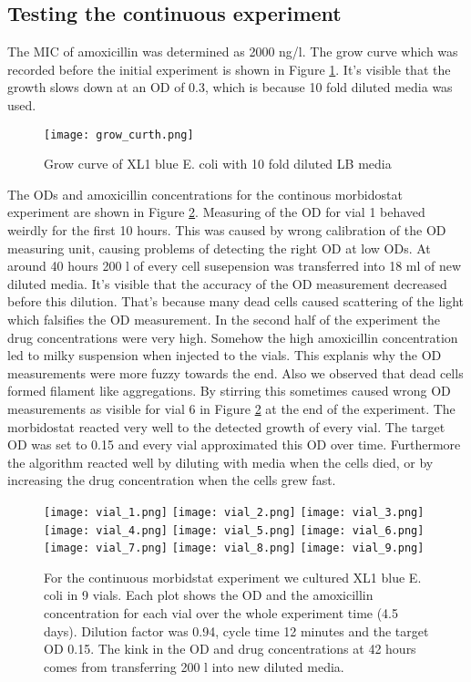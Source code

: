 \subsection{Testing the continuous experiment}
The MIC of amoxicillin was determined as 2000 ng/\textmu l. The grow curve which was recorded before the initial experiment is shown in Figure \ref{figure:grow_curve}. It's visible that the growth slows down at an OD of 0.3, which is because 10 fold diluted media was used. 
\begin{figure}
	\texttt{[image: grow\_curth.png]}\hfill
	\caption{Grow curve of XL1 blue E. coli with 10 fold diluted LB media}
	\label{figure:grow_curve}
\end{figure}
The ODs and amoxicillin concentrations for the continous morbidostat experiment are shown in Figure \ref{figure:continuos_test}. Measuring of the OD for vial 1 behaved weirdly for the first 10 hours. This was caused by wrong calibration of the OD measuring unit, causing problems of detecting the right OD at low ODs. At around 40 hours 200 \textmu l of every cell susepension was transferred into 18 ml of new diluted media. It's visible that the accuracy of the OD measurement decreased before this dilution. That's because many dead cells caused scattering of the light which falsifies the OD measurement. In the second half of the experiment the drug concentrations were very high. Somehow the high amoxicillin concentration led to milky suspension when injected to the vials. This explanis why the OD measurements were more fuzzy towards the end. Also we observed that dead cells formed filament like aggregations. By stirring this sometimes caused wrong OD measurements as visible for vial 6 in Figure \ref{figure:continuos_test} at the end of the experiment. The morbidostat reacted very well to the detected growth of every vial. The target OD was set to 0.15 and every vial approximated this OD over time. Furthermore the algorithm reacted well by diluting with media when the cells died, or by increasing the drug concentration when the cells grew fast. \\
\begin{figure}
	\texttt{[image: vial\_1.png]}\hfill
	\texttt{[image: vial\_2.png]}\hfill
	\texttt{[image: vial\_3.png]}\hfill
	\texttt{[image: vial\_4.png]}\hfill
	\texttt{[image: vial\_5.png]}\hfill
	\texttt{[image: vial\_6.png]}\hfill
	\texttt{[image: vial\_7.png]}\hfill
	\texttt{[image: vial\_8.png]}\hfill
	\texttt{[image: vial\_9.png]}\hfill
	\caption{For the continuous morbidstat experiment we cultured XL1 blue E. coli in 9 vials. Each plot shows the OD and the amoxicillin concentration for each vial over the whole experiment time (4.5 days). Dilution factor was 0.94, cycle time 12 minutes and the target OD 0.15. The kink in the OD and drug concentrations at 42 hours comes from transferring 200 \textmu l into new diluted media.}
	\label{figure:continuos_test}
\end{figure}
